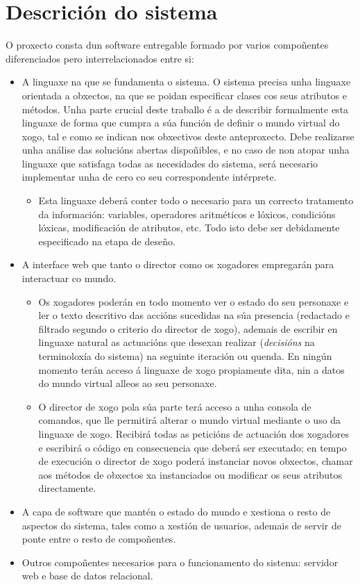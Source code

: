 \section{Descrición do sistema}
O proxecto consta dun software entregable formado por varios compoñentes
diferenciados pero interrelacionados entre si:
\begin{itemize}
  \item A linguaxe na que se fundamenta o sistema. O sistema precisa unha
  linguaxe orientada a obxectos, na que se poidan especificar clases cos seus
  atributos e métodos. Unha parte crucial deste traballo é a de describir
  formalmente esta linguaxe de forma que cumpra a súa función de definir o
  mundo virtual do xogo, tal e como se indican nos obxectivos deste
  anteproxecto. Debe realizarse unha análise das solucións abertas dispoñibles,
  e no caso de non atopar unha linguaxe que satisfaga todas as necesidades do
  sistema, será necesario implementar unha de cero co seu correspondente
  intérprete.
  \begin{itemize}
    \item Esta linguaxe deberá conter todo o necesario para un correcto
    tratamento da información:
    variables, operadores aritméticos e lóxicos, condicións lóxicas,
    modificación de atributos, etc.
    Todo isto debe ser debidamente especificado na etapa de deseño.
  \end{itemize}
  \item A interface web que tanto o director como os xogadores empregarán para
  interactuar co mundo.
  \begin{itemize}
    \item Os xogadores poderán en todo momento ver o estado do seu personaxe e
    ler o texto descritivo das accións sucedidas na súa presencia (redactado e
    filtrado segundo o criterio do director de xogo), ademais de escribir en
    linguaxe natural as actuacións que desexan realizar ({\it decisións} na
    terminoloxía do sistema) na seguinte iteración ou quenda. En ningún momento
    terán acceso á linguaxe de xogo propiamente dita, nin a datos do mundo
    virtual alleos ao seu personaxe.
    \item O director de xogo pola súa parte terá acceso a unha consola de comandos,
    que lle permitirá alterar o mundo virtual mediante o uso da linguaxe de
    xogo. Recibirá todas as peticións de actuación dos xogadores e escribirá o
    código en consecuencia que deberá ser executado; en tempo de execución o 
   director de xogo poderá instanciar novos obxectos, chamar aos métodos de
   obxectos xa instanciados ou modificar os seus atributos directamente.
  \end{itemize}
  \item A capa de software que mantén o estado do mundo e xestiona o resto de
  aspectos do sistema, tales como a xestión de usuarios, ademais de servir de
  ponte entre o resto de compoñentes.
  \item Outros compoñentes necesarios para o funcionamento do sistema: servidor
  web e base de datos relacional.
\end{itemize}
